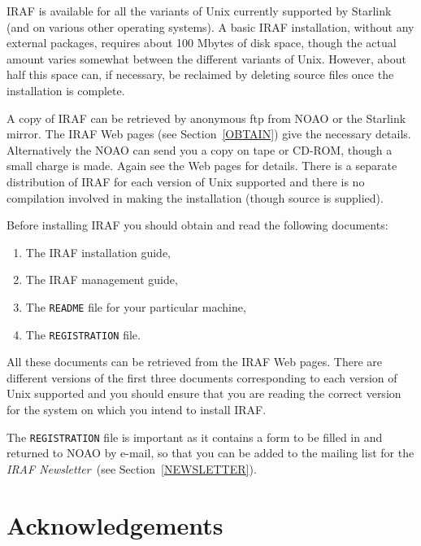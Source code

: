 \documentclass[twoside,11pt]{article}
\newcommand{\htmladdnormallink}[2]{#1}
\begin{document}
IRAF is available for all the variants of Unix currently supported by
Starlink (and on various other operating systems).  A basic IRAF
installation, without any external packages, requires about 100
Mbytes of disk space, though the actual amount varies somewhat between
the different variants of Unix.  However, about half this space can,
if necessary, be reclaimed by deleting source files once the installation
is complete.

A copy of IRAF can be retrieved by anonymous ftp from NOAO or the
Starlink mirror.  The \htmladdnormallink{IRAF Web pages}
{http://www.starlink.ac.uk/iraf/web/iraf-homepage.html}
(see Section~\ref{OBTAIN}) give the necessary details.  Alternatively
the NOAO can send you a copy on tape or CD-ROM, though a small charge
is made.  Again see the Web pages for details.  There is a separate
distribution of IRAF for each version of Unix supported and there
is no compilation involved in making the installation (though source
is supplied).

Before installing IRAF you should obtain and read the following
documents:

\begin{enumerate}

  \item The IRAF installation guide,

  \item The IRAF management guide,

  \item The {\tt README} file for your particular machine,

  \item The {\tt REGISTRATION} file.

\end{enumerate}

All these documents can be retrieved from the IRAF Web pages.  There
are different versions of the \htmladdnormallink{first three documents}
{http://www.starlink.ac.uk/iraf/web/docs/igsm.html}
corresponding to each version of Unix supported and you should ensure
that you are reading the correct version for the system on which you
intend to install IRAF.

The {\tt REGISTRATION} file is important as it contains a form to be
filled in and returned to NOAO by e-mail, so that you can be added to
the mailing list for the {\it IRAF Newsletter}\, (see
Section~\ref{NEWSLETTER}).


\newpage
{}
\section*{Acknowledgements}
\end{document}
